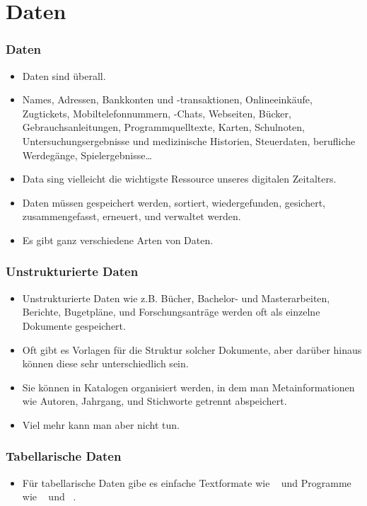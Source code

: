 \documentclass[aspectratio=169,mathserif,notheorems]{beamer}%
\begin{document}
\section{Daten}%
%
\begin{frame}
\frametitle{Daten}%
\begin{itemize}%
\item Daten sind überall.%
\item<2-> Names, Adressen, Bankkonten und -transaktionen,  Onlineeinkäufe, Zugtickets, Mobiltelefonnummern, -Chats, Webseiten, Bücker, Gebrauchsanleitungen, Programmquelltexte, Karten, Schulnoten, Untersuchungsergebnisse und medizinische Historien, Steuerdaten, berufliche Werdegänge, Spielergebnisse{\dots}%
\item<4-> Data sing vielleicht die wichtigste Ressource unseres digitalen Zeitalters.%
\item<5-> Daten müssen gespeichert werden, sortiert, wiedergefunden, gesichert, zusammengefasst, erneuert, und verwaltet werden.%
\item<6-> Es gibt ganz verschiedene Arten von Daten.
\end{itemize}%
\end{frame}%
%
\begin{frame}[t]%
\frametitle{Unstrukturierte Daten}%
\begin{itemize}%
\item Unstrukturierte Daten wie z.B. Bücher, Bachelor- und Masterarbeiten, Berichte, Bugetpläne, und Forschungsanträge werden oft als einzelne Dokumente gespeichert.%
\item<3-> Oft gibt es Vorlagen für die Struktur solcher Dokumente, aber darüber hinaus können diese sehr unterschiedlich sein.%
\item<4-> Sie können in Katalogen organisiert werden, in dem man Metainformationen wie Autoren, Jahrgang, und Stichworte getrennt abspeichert.%
\item<5-> Viel mehr kann man aber nicht tun.%
\end{itemize}%
%
%
\end{frame}%
%
%
\begin{frame}[t]%
\frametitle{Tabellarische Daten}%
\begin{itemize}%
\item Für tabellarische Daten gibe es einfache Textformate wie ~\cite{RFC4180} und Programme wie \microsoftExcel~\cite{B2023DMWME,G2024ECRFMME} und \libreofficeCalc~\cite{S2022L7PFEUU,DF2024LTDF}.%
\end{itemize}%
%
%
\end{frame}%
\end{document}
